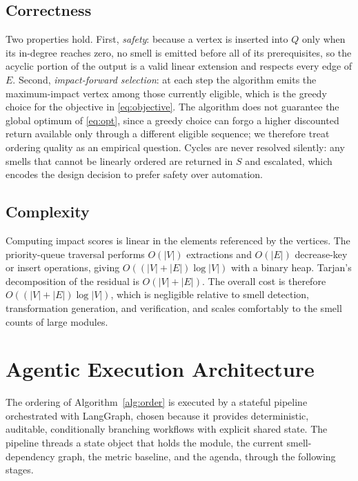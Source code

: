\documentclass[journal,onecolumn,11pt]{IEEEtran}
\begin{document}
\subsection{Correctness}
Two properties hold. First, \emph{safety}: because a vertex is inserted into $Q$ only when its in-degree reaches zero, no smell is emitted before all of its prerequisites, so the acyclic portion of the output is a valid linear extension and respects every edge of $E$. Second, \emph{impact-forward selection}: at each step the algorithm emits the maximum-impact vertex among those currently eligible, which is the greedy choice for the objective in \eqref{eq:objective}. The algorithm does not guarantee the global optimum of \eqref{eq:opt}, since a greedy choice can forgo a higher discounted return available only through a different eligible sequence; we therefore treat ordering quality as an empirical question. Cycles are never resolved silently: any smells that cannot be linearly ordered are returned in $S$ and escalated, which encodes the design decision to prefer safety over automation.

\subsection{Complexity}
Computing impact scores is linear in the elements referenced by the vertices. The priority-queue traversal performs $O(|V|)$ extractions and $O(|E|)$ decrease-key or insert operations, giving $O((|V|+|E|)\log|V|)$ with a binary heap. Tarjan's decomposition of the residual is $O(|V|+|E|)$. The overall cost is therefore $O((|V|+|E|)\log|V|)$, which is negligible relative to smell detection, transformation generation, and verification, and scales comfortably to the smell counts of large modules.

\section{Agentic Execution Architecture}
\label{sec:arch}
The ordering of Algorithm~\ref{alg:order} is executed by a stateful pipeline orchestrated with LangGraph, chosen because it provides deterministic, auditable, conditionally branching workflows with explicit shared state. The pipeline threads a state object that holds the module, the current smell-dependency graph, the metric baseline, and the agenda, through the following stages.
\end{document}
